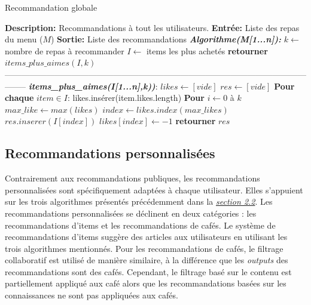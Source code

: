 \documentclass[11pt]{article}
\begin{document}
\begin{algorithm}
    \caption{Recommandation globale}
    \begin{algorithmic}[1]
        \Statex \textbf{Description:} Recommandations à tout les utilisateurs.
        \Statex \textbf{Entrée:} Liste des repas du menu ($M$)
        \Statex \textbf{Sortie:} Liste des recommandations
        \State \textbf{\textit{Algorithme(M[1...n]):}}
        \State \hspace{0.5cm} $k \leftarrow$ nombre de repas à recommander
        \State \hspace{0.5cm} $I \leftarrow$ items les plus achetés
        \State \hspace{0.5cm} \textbf{retourner} $items\_plus\_aimes(I,k)$
        \\
--------------------------------------------------------------------------------------------------------------------
	\State \textbf{\textit{items\_plus\_aimes(I[1...n],k))}}:
	\State \hspace{0.5cm} $likes \leftarrow [vide]$
	\State \hspace{0.5cm} $res \leftarrow [vide]$
	\State \hspace{0.5cm} \textbf{Pour chaque} $item \in I$:
	\State \hspace{1cm} likes.insérer(item.likes.length)
	\State \hspace{0.5cm} \textbf{Pour} $i \leftarrow 0$ à $k$
	\State \hspace{1cm} $max\_like \leftarrow max(likes)$
	\State \hspace{1cm} $index \leftarrow likes.index(max\_likes)$ 
	\State \hspace{1cm} $res.inserer(I[index])$
	\State \hspace{1cm} $likes[index] \leftarrow -1$
	\State \hspace{0.5cm} \textbf{retourner} $res$
    \end{algorithmic}
\end{algorithm}

\newpage
\subsection{Recommandations personnalisées}
Contrairement aux recommandations publiques, les recommandations personnalisées sont spécifiquement adaptées à chaque utilisateur. Elles s’appuient sur les trois algorithmes présentés précédemment dans la \hyperref[2.2]{\textit{section 2.2}}. Les recommandations personnalisées se déclinent en deux catégories : les recommandations d'items et les recommandations de cafés. Le système de recommandations d'items suggère des articles aux utilisateurs en utilisant les trois algorithmes mentionnés. Pour les recommandations de cafés, le filtrage collaboratif est utilisé de manière similaire, à la différence que les \textit{outputs} des recommandations sont des cafés. Cependant, le filtrage basé sur le contenu est partiellement appliqué aux café alors que les recommandations basées sur les connaissances ne sont pas appliquées aux cafés.
\end{document}
